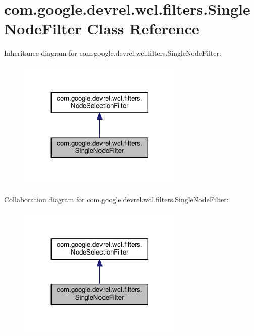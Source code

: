 \hypertarget{classcom_1_1google_1_1devrel_1_1wcl_1_1filters_1_1SingleNodeFilter}{}\section{com.\+google.\+devrel.\+wcl.\+filters.\+Single\+Node\+Filter Class Reference}
\label{classcom_1_1google_1_1devrel_1_1wcl_1_1filters_1_1SingleNodeFilter}


Inheritance diagram for com.\+google.\+devrel.\+wcl.\+filters.\+Single\+Node\+Filter\+:
\nopagebreak
\begin{figure}[H]
\begin{center}
\leavevmode
\includegraphics[width=224pt]{df/d3c/classcom_1_1google_1_1devrel_1_1wcl_1_1filters_1_1SingleNodeFilter__inherit__graph}
\end{center}
\end{figure}


Collaboration diagram for com.\+google.\+devrel.\+wcl.\+filters.\+Single\+Node\+Filter\+:
\nopagebreak
\begin{figure}[H]
\begin{center}
\leavevmode
\includegraphics[width=224pt]{d7/daa/classcom_1_1google_1_1devrel_1_1wcl_1_1filters_1_1SingleNodeFilter__coll__graph}
\end{center}
\end{figure}
